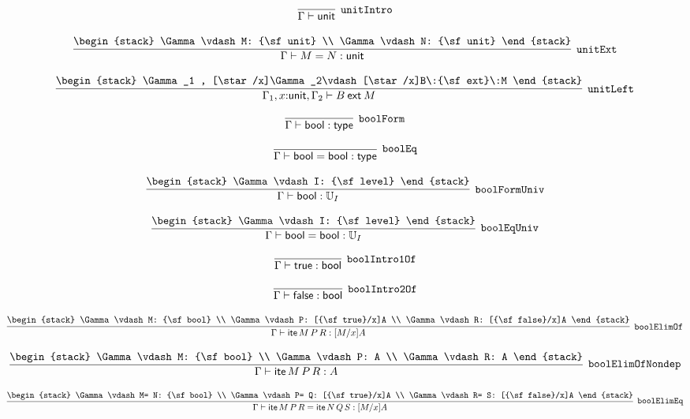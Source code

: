 \[
\infer[{\tt unitIntro}]{\Gamma \vdash {\sf unit}}{}
\]

\[
\infer[{\tt unitExt}]{\Gamma \vdash M= N: {\sf unit}}{
\begin{stack}
\Gamma \vdash M: {\sf unit}
\\
\Gamma \vdash N: {\sf unit}
\end{stack}}
\]

\[
\infer[{\tt unitLeft}]{\Gamma_1 ,x\mathord{:}{\sf unit}, \Gamma_2 \vdash B\:{\sf ext}\:M}{
\begin{stack}
\Gamma_1 , [\star /x]\Gamma_2\vdash [\star /x]B\:{\sf ext}\:M
\end{stack}}
\]

\[
\infer[{\tt boolForm}]{\Gamma \vdash {\sf bool}: {\sf type}}{}
\]

\[
\infer[{\tt boolEq}]{\Gamma \vdash {\sf bool}= {\sf bool}: {\sf type}}{}
\]

\[
\infer[{\tt boolFormUniv}]{\Gamma \vdash {\sf bool}: {\Bbb U}_{I}}{
\begin{stack}
\Gamma \vdash I: {\sf level}
\end{stack}}
\]

\[
\infer[{\tt boolEqUniv}]{\Gamma \vdash {\sf bool}= {\sf bool}: {\Bbb U}_{I}}{
\begin{stack}
\Gamma \vdash I: {\sf level}
\end{stack}}
\]

\[
\infer[{\tt boolIntro1Of}]{\Gamma \vdash {\sf true}: {\sf bool}}{}
\]

\[
\infer[{\tt boolIntro2Of}]{\Gamma \vdash {\sf false}: {\sf bool}}{}
\]

\[
\infer[{\tt boolElimOf}]{\Gamma \vdash {\sf ite}\,M\,P\,R: [M/x]A}{
\begin{stack}
\Gamma \vdash M: {\sf bool}
\\
\Gamma \vdash P: [{\sf true}/x]A
\\
\Gamma \vdash R: [{\sf false}/x]A
\end{stack}}
\]

\[
\infer[{\tt boolElimOfNondep}]{\Gamma \vdash {\sf ite}\,M\,P\,R: A}{
\begin{stack}
\Gamma \vdash M: {\sf bool}
\\
\Gamma \vdash P: A
\\
\Gamma \vdash R: A
\end{stack}}
\]

\[
\infer[{\tt boolElimEq}]{\Gamma \vdash {\sf ite}\,M\,P\,R= {\sf ite}\,N\,Q\,S: [M/x]A}{
\begin{stack}
\Gamma \vdash M= N: {\sf bool}
\\
\Gamma \vdash P= Q: [{\sf true}/x]A
\\
\Gamma \vdash R= S: [{\sf false}/x]A
\end{stack}}
\]

